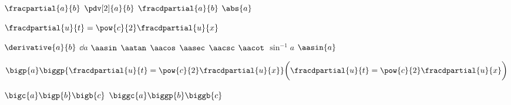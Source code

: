 $\fracpartial{a}{b}$
$\pdv[2]{a}{b}$
$\fracdpartial{a}{b}$
$\abs{a}$

$\fracdpartial{u}{t} = \pow{c}{2} \fracdpartial{u}{x}$

$\derivative{a}{b}$
$\dd{a}$ 
$\aasin$
$\aatan$
$\aacos$
$\aasec$
$\aacsc$
$\aacot$
\newp
$\sin^{-1}a$
\newp
$\aasin{a}$


$\bigp{a} \biggp{\fracdpartial{u}{t} = \pow{c}{2} \fracdpartial{u}{x}} \biggl(\fracdpartial{u}{t} = \pow{c}{2} \fracdpartial{u}{x}\biggr)$

$\bigc{a} \bigp{b} \bigb{c}$
$\biggc{a} \biggp{b} \biggb{c}$

\restartequation


